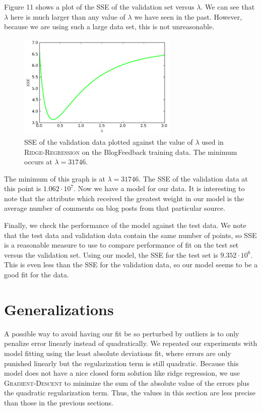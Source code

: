 \documentclass{sigchi}
\begin{document}
Figure 11 shows a plot of the SSE of the validation set versus $\lambda$. We can see that $\lambda$ here is much larger than any value of $\lambda$ we have seen in the past. However, because we are using such a large data set, this is not unreasonable.

\begin{figure}[!]
\centering
\includegraphics[width=3in]{min_lam.png}
\caption{SSE of the validation data plotted against the value of $\lambda$ used in \textsc{Ridge-Regression} on the BlogFeedback training data. The minimum occurs at $\lambda = 31746$.}
\end{figure}

The minimum of this graph is at $\lambda = 31746$. The SSE of the validation data at this point is $1.062 \cdot 10^7$. Now we have a model for our data. It is interesting to note that the attribute which received the greatest weight in our model is the average number of comments on blog posts from that particular source.

Finally, we check the performance of the model against the test data. We note that the test data and validation data contain the same number of points, so SSE is a reasonable measure to use to compare performance of fit on the test set versus the validation set. Using our model, the SSE for the test set is $9.352 \cdot 10^6$. This is even less than the SSE for the validation data, so our model seems to be a good fit for the data.

\section{Generalizations}


A possible way to avoid having our fit be so perturbed by outliers is to only penalize error linearly instead of quadratically. We repeated our experiments with model fitting using the least absolute deviations fit, where errors are only punished linearly but the regularization term is still quadratic. Because this model does not have a nice closed form solution like ridge regression, we use \textsc{Gradient-Descent} to minimize the sum of the absolute value of the errors plus the quadratic regularization term. Thus, the values in this section are less precise than those in the previous sections.
\end{document}
